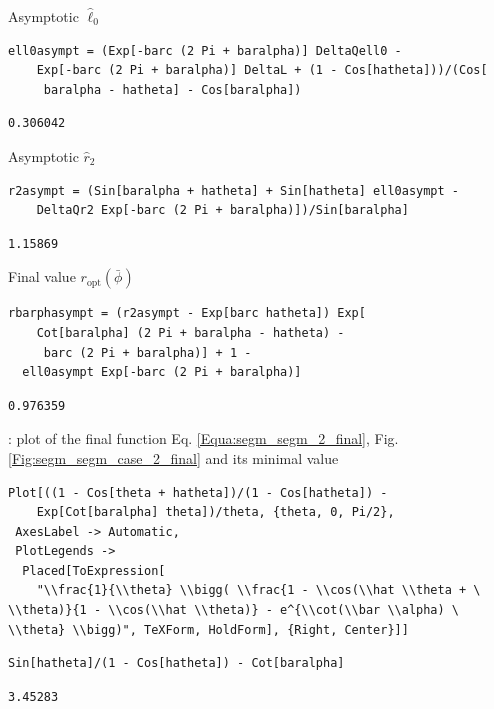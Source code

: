 \documentclass[reqno]{amsart}
\theoremstyle{definition} \newtheorem{definition}{Definition}[section]
\theoremstyle{definition} \newtheorem{remark}[definition]{Remark}
\theoremstyle{plain} \newtheorem{lemma}[definition]{Lemma}
\theoremstyle{plain} \newtheorem{proposition}[definition]{Proposition}
\theoremstyle{plain} \newtheorem{theorem}[definition]{Theorem}
\theoremstyle{plain} \newtheorem{corollary}[definition]{Corollary}
\theoremstyle{definition} \newtheorem{example}[definition]{Example}
\theoremstyle{plain} \newtheorem{claim}[clai]{Claim}
\theoremstyle{definition} \newtheorem{assumption}[definition]{Assumption}
\theoremstyle{definition} \newtheorem{observation}[definition]{Observation}
\newcommand{\1}{\mathbbm 1}
\newcommand{\smed}{\medskip}
\newcommand{\sbig}{\bigskip}
\numberwithin{equation}{section} %
\theoremstyle{plain} \newtheorem*{theorem*}{Theorem}
\theoremstyle{plain} \newtheorem{mthm}[maintheorem]{Main Theorem}
\theoremstyle{plain} \newtheorem*{mthm*}{Main Theorem}
\theoremstyle{plain} \newtheorem*{conjecture*}{Conjecture}
\theoremstyle{plain} \newtheorem{conjecture}[definition]{Conjecture}
\theoremstyle{plain} \newtheorem*{problem*}{Problem}
\begin{document}
\smed
Asymptotic $\hat \ell_0$
\smed
\begin{verbatim}
ell0asympt = (Exp[-barc (2 Pi + baralpha)] DeltaQell0 - 
    Exp[-barc (2 Pi + baralpha)] DeltaL + (1 - Cos[hatheta]))/(Cos[
     baralpha - hatheta] - Cos[baralpha]) 
\end{verbatim}
\begin{verbatim}
0.306042
\end{verbatim}
\smed
Asymptotic $\hat r_2$
\smed
\begin{verbatim}
r2asympt = (Sin[baralpha + hatheta] + Sin[hatheta] ell0asympt - 
    DeltaQr2 Exp[-barc (2 Pi + baralpha)])/Sin[baralpha]
\end{verbatim}
\begin{verbatim}
1.15869
\end{verbatim}
\smed
Final value $r_{\mathrm{opt}}(\bar \phi)$
\smed
\begin{verbatim}
rbarphasympt = (r2asympt - Exp[barc hatheta]) Exp[
    Cot[baralpha] (2 Pi + baralpha - hatheta) - 
     barc (2 Pi + baralpha)] + 1 - 
  ell0asympt Exp[-barc (2 Pi + baralpha)]
\end{verbatim}
\begin{verbatim}
0.976359
\end{verbatim}

\sbig


\sbig

: plot of the final function Eq. \eqref{Equa:segm_segm_2_final}, Fig. \ref{Fig:segm_segm_case_2_final} and its minimal value

\sbig

\begin{verbatim}
Plot[((1 - Cos[theta + hatheta])/(1 - Cos[hatheta]) - 
    Exp[Cot[baralpha] theta])/theta, {theta, 0, Pi/2}, 
 AxesLabel -> Automatic, 
 PlotLegends -> 
  Placed[ToExpression[
    "\\frac{1}{\\theta} \\bigg( \\frac{1 - \\cos(\\hat \\theta + \
\\theta)}{1 - \\cos(\\hat \\theta)} - e^{\\cot(\\bar \\alpha) \
\\theta} \\bigg)", TeXForm, HoldForm], {Right, Center}]]
\end{verbatim}
\begin{verbatim}
Sin[hatheta]/(1 - Cos[hatheta]) - Cot[baralpha]
\end{verbatim}
\begin{verbatim}
3.45283
\end{verbatim}
\end{document}
